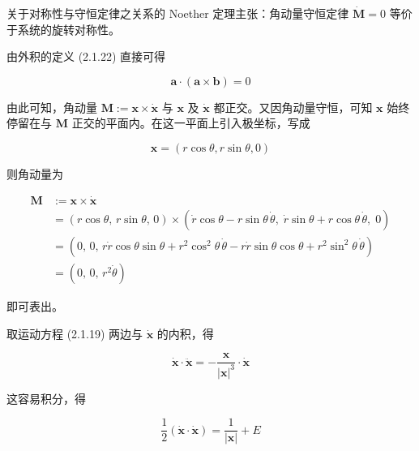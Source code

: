 关于对称性与守恒定律之关系的 Noether 定理主张：角动量守恒定律 $\dot{\bm{M}}=0$
等价于系统的旋转对称性。

由外积的定义 (2.1.22) 直接可得

\begin{equation}
  \bm{a}\cdot(\bm{a}\times\bm{b}) = 0
  \tag{2.1.29}
\end{equation}

由此可知，角动量 $\bm{M} := \bm{x}\times\dot{\bm{x}}$ 与 $\bm{x}$ 及
$\dot{\bm{x}}$ 都正交。又因角动量守恒，可知 $\bm{x}$ 始终停留在与 $\bm{M}$
正交的平面内。在这一平面上引入极坐标，写成

\begin{equation}
  \bm{x} = (r\cos\theta, r\sin\theta, 0)
  \tag{2.1.30}
\end{equation}

则角动量为

\begin{equation}
\begin{aligned}
  \bm{M} &:= \bm{x}\times\dot{\bm{x}}\\
  &= (r\cos\theta,\, r\sin\theta,\, 0)\times
     (\dot r\cos\theta - r\sin\theta\,\dot\theta,\;
      \dot r\sin\theta + r\cos\theta\,\dot\theta,\; 0)\\
  &= (0,\, 0,\, r\dot r\cos\theta\sin\theta + r^2\cos^2\theta\,\dot\theta
      - r\dot r\sin\theta\cos\theta + r^2\sin^2\theta\,\dot\theta)\\
  &= (0,\, 0,\, r^2\dot\theta)
\end{aligned}
  \tag{2.1.31}
\end{equation}

即可表出。

取运动方程 (2.1.19) 两边与 $\dot{\bm{x}}$ 的内积，得

\begin{equation}
  \dot{\bm{x}}\cdot\ddot{\bm{x}}
    = -\frac{\bm{x}}{|\bm{x}|^3}\cdot\dot{\bm{x}}
  \tag{2.1.32}
\end{equation}

这容易积分，得

\begin{equation}
  \frac{1}{2}(\dot{\bm{x}}\cdot\dot{\bm{x}})
    = \frac{1}{|\bm{x}|} + E
  \tag{2.1.33}
\end{equation}

